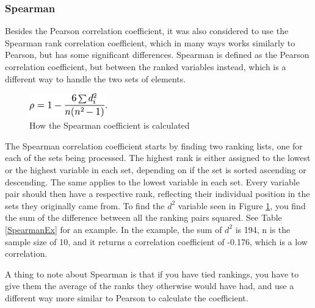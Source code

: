 \subsubsection{Spearman}

Besides the Pearson correlation coefficient, it was also considered to use the Spearman rank correlation coefficient, which in many ways works similarly to Pearson, but has some significant differences. Spearman is defined as the Pearson correlation coefficient, but between the ranked variables instead, which is a different way to handle the two sets of elements. \cite{Spearman2}

\begin{figure}[htb]
\centering
\includegraphics[width=0.3\textwidth]{Images/SpearmanCalc.png}
\caption{How the Spearman coefficient is calculated \cite{Spearman2}}
\label{SpearCalc}
\end{figure}

The Spearman correlation coefficient starts by finding two ranking lists, one for each of the sets being processed. The highest rank is either assigned to the lowest or the highest variable in each set, depending on if the set is sorted ascending or descending. The same applies to the lowest variable in each set. Every variable pair should then have a respective rank, reflecting their individual position in the sets they originally came from. To find the $d^2$ variable seen in Figure \ref{SpearCalc}, you find the sum of the difference between all the ranking pairs squared. See Table \ref{SpearmanEx} for an example. In the example, the sum of $d^2$ is 194, n is the sample size of 10, and it returns a correlation coefficient of -0.176, which is a low correlation. \cite{Spearman2}

A thing to note about Spearman is that if you have tied rankings, you have to give them the average of the ranks they otherwise would have had, and use a different way more similar to Pearson to calculate the coefficient. \cite{Spearman1}

